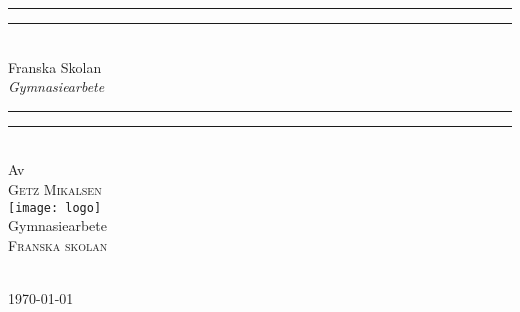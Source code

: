\begin{titlingpage}
\begin{SingleSpace}
\calccentering{\unitlength}
\vspace*{13pt}
\begin{center}
\rule[0.5ex]{\linewidth}{2pt}\vspace*{-\baselineskip}\vspace*{3.2pt}
\rule[0.5ex]{\linewidth}{1pt}\\[\baselineskip]
{\HUGE Franska Skolan }\\[4mm]
{\Large \textit{Gymnasiearbete}}\\
\rule[0.5ex]{\linewidth}{1pt}\vspace*{-\baselineskip}\vspace{3.2pt}
\rule[0.5ex]{\linewidth}{2pt}\\
\vspace{6.5mm}
{\large Av}\\
\vspace{6.5mm}
{\large\textsc{Getz Mikalsen}}\\
\vspace{11mm}
\texttt{[image: logo]}\\
\vspace{6mm}
{\large Gymnasiearbete\\
\textsc{Franska skolan}}\\
\vspace{11mm}
\begin{minipage}{10cm}
\lipsum[66]
\end{minipage}\\
\vspace{9mm}
\today        %
\vspace{12mm}
\end{center}
\end{SingleSpace}

\end{titlingpage}

\pagebreak
